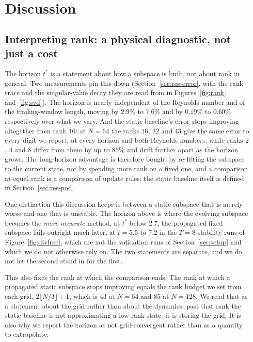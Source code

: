 
\section{Discussion}
\label{sec:discussion}

\subsection{Interpreting rank: a physical diagnostic, not just a cost}
\label{sec:disc-rank}

The horizon $t^\ast$ is a statement about how a subspace is built, not about rank in
general. Two measurements pin this down
(Section~\ref{sec:res-error}, with the rank trace and the singular-value decay
they are read from in Figures~\ref{fig:rank} and~\ref{fig:svd}). The horizon is
nearly independent of the
Reynolds number and of the trailing-window length, moving by $2.9\%$ to $7.6\%$ and by
$0.19\%$ to $0.60\%$ respectively over what we vary. And the static baseline's error
stops improving altogether from rank $16$: at $N=64$ the ranks $16$, $32$ and $43$ give
the same error to every digit we report, at every horizon and both Reynolds numbers,
while ranks $2$, $4$ and $8$ differ from them by up to $85\%$ and drift further apart
as the horizon grows. The long-horizon advantage is therefore bought by re-fitting the
subspace to the current state, not by spending more rank on a fixed one, and a
comparison at equal rank is a comparison of update rules; the static baseline
itself is defined in Section~\ref{sec:res-pod}.

One distinction this discussion keeps is between a static subspace that is
merely worse and one that is unstable. The horizon above is where the evolving
subspace becomes the \emph{more accurate} method, at $t^\ast$ below $2.7$; the
propagated fixed subspace fails outright much later, at $t = 5.5$ to $7.2$ in the
$T=8$ stability runs of Figure~\ref{fig:divfree}, which are not the validation
runs of Section~\ref{sec:setup} and which we do not otherwise rely on. The two
statements are separate, and we do not let the second stand in for the first.

This also fixes the rank at which the comparison ends. The rank at which a propagated
static subspace stops improving equals the rank budget we set from each grid, $2\lfloor N/3\rfloor+1$, which is $43$ at $N=64$ and $85$ at $N=128$. We read that as a
statement about the grid rather than about the dynamics: past that rank the static
baseline is not approximating a low-rank state, it is storing the grid. It is also why
we report the horizon as not grid-convergent rather than as a quantity to extrapolate.

